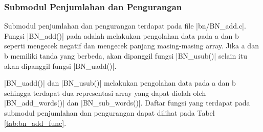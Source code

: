     \subsubsection{Submodul Penjumlahan dan Pengurangan}
      Submodul penjumlahan dan pengurangan terdapat pada file |bn/BN_add.c|. Fungsi |BN_add()| pada adalah melakukan pengolahan data pada a dan b seperti mengecek negatif dan mengecek panjang masing-masing array. Jika a dan b memiliki tanda yang berbeda, akan dipanggil fungsi |BN_usub()| selain itu akan dipanggil fungsi |BN_uadd()|.

      |BN_uadd()| dan |BN_usub()| melakukan pengolahan data pada a dan b sehingga terdapat dua representasi array yang dapat diolah oleh |BN_add_words()| dan |BN_sub_words()|. Daftar fungsi yang terdapat pada submodul penjumlahan dan pengurangan dapat dilihat pada Tabel \ref{tab:bn_add_func}.

